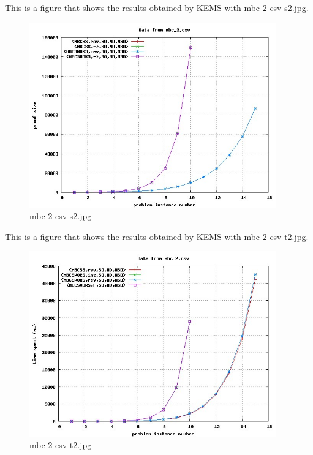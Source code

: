 This is a figure that shows the results obtained by KEMS with mbc-2-csv-s2.jpg.
\begin{figure}[htbp]
\begin{center}
\includegraphics[width=0.95\textwidth]{figuras/mbc-2-csv-s2.jpg}
\end{center}
\caption{mbc-2-csv-s2.jpg}
\end{figure}

This is a figure that shows the results obtained by KEMS with mbc-2-csv-t2.jpg.
\begin{figure}[htbp]
\begin{center}
\includegraphics[width=0.95\textwidth]{figuras/mbc-2-csv-t2.jpg}
\end{center}
\caption{mbc-2-csv-t2.jpg}
\end{figure}

